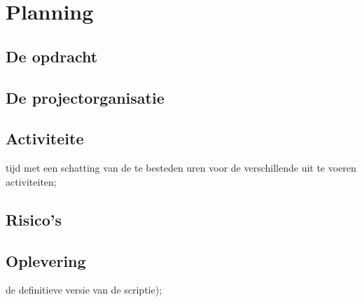 \chapter{Planning} %

\section{De opdracht} %

\section{De projectorganisatie} %

\section{Activiteite} %
tijd met een schatting van de te besteden uren voor de verschillende uit te voeren activiteiten;

\section{Risico's} %

\section{Oplevering}

de definitieve versie van de scriptie);